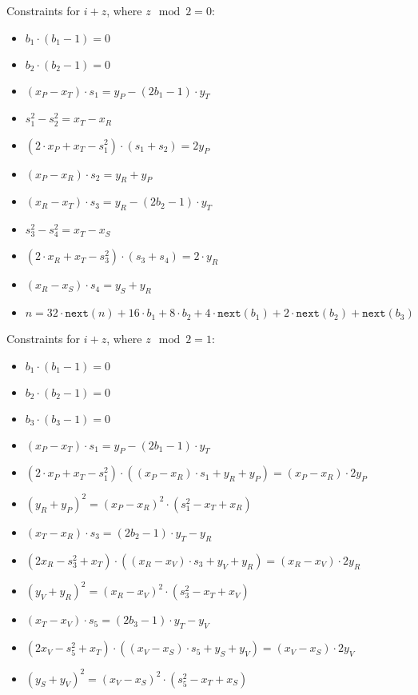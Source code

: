 Constraints for $i + z$, where $z\mod 2 = 0$:
\begin{itemize}
    \item $b_1 \cdot (b_1 - 1) = 0$
    \item $b_2 \cdot (b_2 - 1) = 0$
    \item $(x_P - x_T) \cdot s_1 = y_P - (2b_1 - 1) \cdot y_T$
    \item $s_1^2 - s_2^2 = x_T - x_R$
    \item $(2 \cdot x_P + x_T - s_1^2) \cdot (s_1 + s_2) = 2y_P$
    \item $(x_P - x_R) \cdot s_2 = y_R + y_P$
    \item $(x_R - x_T) \cdot s_3 = y_R - (2b_2 - 1) \cdot y_T$
    \item $s_3^2 - s_4^2 = x_T - x_S$
    \item $(2 \cdot x_R + x_T - s_3^2) \cdot (s_3 + s_4) = 2 \cdot y_R$
    \item $(x_R - x_S) \cdot s_4 = y_S + y_R$
    \item $n = 32 \cdot \texttt{next}(n) + 16 \cdot b_1 + 8 \cdot b_2 + 4 \cdot \texttt{next}(b_1) + 2 \cdot \texttt{next}(b_2) + \texttt{next}(b_3)$
\end{itemize}

Constraints for $i + z$, where $z\mod 2 = 1$:
\begin{itemize}
    \item $b_1 \cdot (b_1 - 1) = 0$
    \item $b_2 \cdot (b_2 - 1) = 0$
    \item $b_3 \cdot (b_3 - 1) = 0$
    \item $(x_P - x_T) \cdot s_1 = y_P - (2b_1 - 1) \cdot y_T$
    \item $(2 \cdot x_P + x_T - s_1^2) \cdot ((x_P - x_R) \cdot s_1 + y_R + y_P) = (x_P - x_R) \cdot 2y_P$\
    \item $(y_R + y_P)^2 = (x_P - x_R)^2 \cdot (s_1^2 - x_T + x_R)$
    \item $(x_T - x_R) \cdot s_3 = (2b_2 - 1) \cdot y_T - y_R$
    \item $(2x_R - s_3^2 + x_T) \cdot ((x_R - x_V) \cdot s_3 + y_V + y_R) = (x_R - x_V) \cdot 2y_R$
    \item $(y_V + y_R)^2 = (x_R - x_V)^2 \cdot (s_3^2 - x_T + x_V)$
    \item $(x_T - x_V) \cdot s_5 = (2b_3 - 1) \cdot y_T - y_V$
    \item $(2x_V - s_5^2 + x_T) \cdot ((x_V - x_S) \cdot s_5 + y_S + y_V) = (x_V - x_S) \cdot 2y_V$
    \item $(y_S + y_V)^2 = (x_V - x_S)^2 \cdot (s_5^2 - x_T + x_S)$
\end{itemize}

